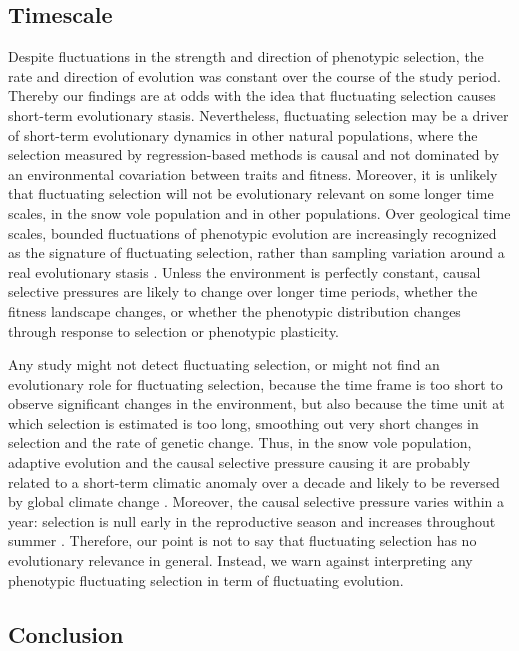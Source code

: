 \subsection*{Timescale} 
Despite fluctuations in the strength and direction of phenotypic selection, the rate and direction of evolution was constant over the course of the study period. Thereby our findings are at odds with the idea that fluctuating selection causes short-term evolutionary stasis. Nevertheless, fluctuating selection may be a driver of short-term evolutionary dynamics in other natural populations, where the selection measured by regression-based methods is causal and not dominated by an environmental covariation between traits and fitness. Moreover, it is unlikely that fluctuating selection will not be evolutionary relevant on some longer time scales, in the snow vole population and in other populations.  Over geological time scales, bounded fluctuations of phenotypic evolution are increasingly recognized as the signature of fluctuating selection, rather than sampling variation around a real evolutionary stasis \parencite{Uyeda2011, Voje2015}. Unless the environment is perfectly constant, causal selective pressures are likely to change over longer time periods, whether the fitness landscape changes, or whether the phenotypic distribution changes through response to selection or phenotypic plasticity. 

Any study might not detect fluctuating selection, or might not find an evolutionary role for fluctuating selection, because the time frame is too short to observe significant changes in the environment, but also because the time unit at which selection is estimated is too long, smoothing out very short changes in selection and the rate of genetic change. Thus, in the snow vole population, adaptive evolution and the causal selective pressure causing it are probably related to a short-term climatic anomaly over a decade and likely to be reversed by global climate change \parencite{Bonnet2016}. Moreover, the causal selective pressure varies within a year: selection is null early in the reproductive season and increases throughout summer \parencite{Bonnet2016}.
Therefore, our point is not to say that fluctuating selection has no evolutionary relevance in general. Instead, we warn against interpreting any phenotypic fluctuating selection in term of fluctuating evolution. 

\subsection*{Conclusion} 

